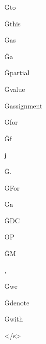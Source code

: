 \documentclass[varwidth]{standalone}
\begin{document}
\begin{CJK*}{UTF8}{gbsn}
{{{\colorbox{red!0.11897838}{\strut Ġto} \colorbox{red!0.12956966}{\strut Ġthis} \colorbox{red!0.056198798}{\strut Ġas} \colorbox{red!0.09018749}{\strut Ġa} \colorbox{red!0.11847973}{\strut Ġpartial} \colorbox{red!0.3589059}{\strut Ġvalue} \colorbox{red!0.20593093}{\strut Ġassignment} \colorbox{red!0.21818027}{\strut Ġfor} \colorbox{red!0.17427273}{\strut Ġf} \colorbox{red!0.11956502}{\strut j} \colorbox{red!0.18900067}{\strut Ġ.} \colorbox{red!0.15683791}{\strut ĠFor} \colorbox{red!0.13106611}{\strut Ġa} \colorbox{red!0.20491192}{\strut ĠDC} \colorbox{red!0.7042546}{\strut OP} \colorbox{red!0.36583164}{\strut ĠM} \colorbox{red!0.09454876}{\strut ,} \colorbox{red!0.11129684}{\strut Ġwe} \colorbox{red!0.32891148}{\strut Ġdenote} \colorbox{red!0.13257188}{\strut Ġwith} \colorbox{red!0.23119959}{\strut </s>} 
}}}
\end{CJK*}
\end{document}
